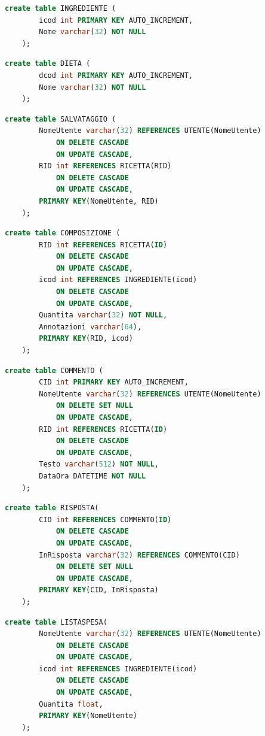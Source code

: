 \documentclass[12pt]{extarticle}
\begin{document}
\begin{lstlisting}[language=SQL]
    create table INGREDIENTE (
        icod int PRIMARY KEY AUTO_INCREMENT,
        Nome varchar(32) NOT NULL
    );
\end{lstlisting}


\begin{lstlisting}[language=SQL]
    create table DIETA (
        dcod int PRIMARY KEY AUTO_INCREMENT,
        Nome varchar(32) NOT NULL
    );
\end{lstlisting}

\begin{lstlisting}[language=SQL]
    create table SALVATAGGIO (
        NomeUtente varchar(32) REFERENCES UTENTE(NomeUtente)
            ON DELETE CASCADE
            ON UPDATE CASCADE,
        RID int REFERENCES RICETTA(RID)
            ON DELETE CASCADE
            ON UPDATE CASCADE,
        PRIMARY KEY(NomeUtente, RID)
    );
\end{lstlisting}

\begin{lstlisting}[language=SQL]
    create table COMPOSIZIONE (
        RID int REFERENCES RICETTA(ID)
            ON DELETE CASCADE
            ON UPDATE CASCADE,
        icod int REFERENCES INGREDIENTE(icod)
            ON DELETE CASCADE
            ON UPDATE CASCADE,
        Quantita varchar(32) NOT NULL,
        Annotazioni varchar(64),
        PRIMARY KEY(RID, icod)
    );
\end{lstlisting}

\begin{lstlisting}[language=SQL]
    create table COMMENTO (
        CID int PRIMARY KEY AUTO_INCREMENT,
        NomeUtente varchar(32) REFERENCES UTENTE(NomeUtente)
            ON DELETE SET NULL
            ON UPDATE CASCADE,
        RID int REFERENCES RICETTA(ID)
            ON DELETE CASCADE
            ON UPDATE CASCADE,
        Testo varchar(512) NOT NULL,
        DataOra DATETIME NOT NULL
    );
\end{lstlisting}

\begin{lstlisting}[language=SQL]
    create table RISPOSTA(
        CID int REFERENCES COMMENTO(ID)
            ON DELETE CASCADE
            ON UPDATE CASCADE,
        InRisposta varchar(32) REFERENCES COMMENTO(CID)
            ON DELETE SET NULL
            ON UPDATE CASCADE,
        PRIMARY KEY(CID, InRisposta)
    );
\end{lstlisting}

\begin{lstlisting}[language=SQL]
    create table LISTASPESA(
        NomeUtente varchar(32) REFERENCES UTENTE(NomeUtente)
            ON DELETE CASCADE
            ON UPDATE CASCADE,
        icod int REFERENCES INGREDIENTE(icod)
            ON DELETE CASCADE
            ON UPDATE CASCADE,
        Quantita float,
        PRIMARY KEY(NomeUtente)
    );
\end{lstlisting}
\end{document}
